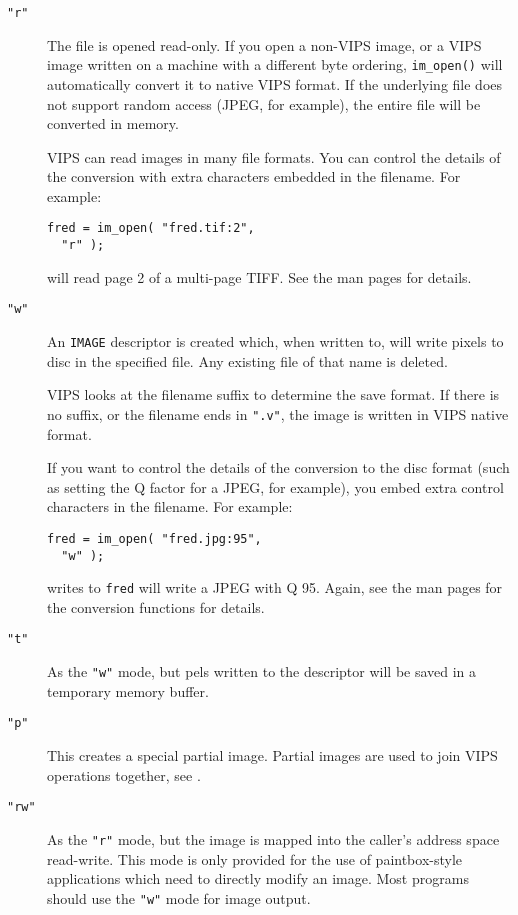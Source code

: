 \begin{description}

\item[\texttt{"r"}]
The file is opened read-only.
If you open a non-VIPS image, or a VIPS image written on a machine with a
different byte ordering, \verb+im_open()+ will automatically convert it to
native VIPS format. If the underlying file does not support random access
(JPEG, for example), the entire file will be converted in memory. 

VIPS can read images in many file formats. You can control the details of
the conversion with extra characters embedded in the filename. For example:

\begin{verbatim}
fred = im_open( "fred.tif:2",
  "r" );
\end{verbatim}

\noindent
will read page 2 of a multi-page TIFF. See the man pages for details.

\item[\texttt{"w"}]
An \verb+IMAGE+ descriptor is created which, when written to, will write
pixels to disc in the specified file. Any existing file of that name is
deleted.

VIPS looks at the filename suffix to determine the save format. If there
is no suffix, or the filename ends in \verb+".v"+, the image is written
in VIPS native format. 

If you want to control the details of the conversion to the disc format (such
as setting the Q factor for a JPEG, for example), you embed extra control
characters in the filename. For example:

\begin{verbatim}
fred = im_open( "fred.jpg:95", 
  "w" );
\end{verbatim}

\noindent
writes to \verb+fred+ will write a JPEG with Q 95. Again, see the man pages
for the conversion functions for details.

\item[\texttt{"t"}]
As the \verb+"w"+ mode, but pels written to the descriptor will be saved
in a temporary memory buffer.

\item[\texttt{"p"}] 
This creates a special partial image. Partial images are used to join VIPS
operations together, see .

\item[\texttt{"rw"}]
As the \verb+"r"+ mode, but the image is mapped into the caller's address
space read-write. This mode is only provided for the use of paintbox-style
applications which need to directly modify an image. Most programs should
use the \verb+"w"+ mode for image output.

\end{description}

